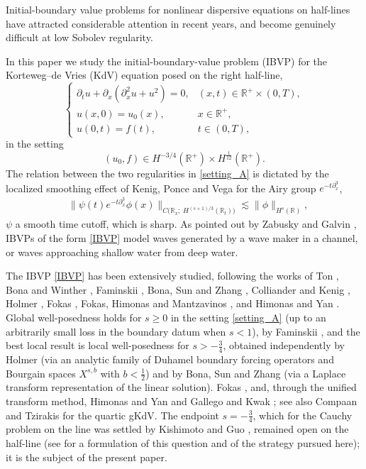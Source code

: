 \documentclass[10pt,reqno]{amsart}
\theoremstyle{remark}
\numberwithin{equation}{section}
\newcommand{\R}{\mathbb R}
\newcommand{\pd}{\partial}
\begin{document}
Initial-boundary value problems for nonlinear dispersive equations on half-lines have attracted considerable attention in recent years, and become genuinely difficult at low Sobolev regularity.

In this paper we study the initial-boundary-value problem (IBVP) for the Korteweg--de Vries (KdV) equation posed on the right half-line,
\begin{equation}\label{IBVP}
	\begin{cases}
		\partial_tu+\partial_x(\partial_x^2 u+u^2)=0  ,& (x,t)\in \mathbb R^+\times(0,T),\\
		u(x,0)=u_0(x),                                   & x\in \mathbb R^+,\\
		u(0,t)=f(t),                                     & t\in(0,T),
	\end{cases}
\end{equation}
in the setting
\begin{equation}\label{setting_A}
(u_0,f)\in H^{-3/4}(\R^+)\times H^{\frac{1}{12}}(\R^+).
\end{equation}
The relation between the two regularities in \eqref{setting_A} is dictated by the localized smoothing effect of Kenig, Ponce and Vega \cite{KPV} for the Airy group $e^{-t\pd_x^3}$,
\begin{align*}
&\|\psi(t) e^{-t\partial_x^3}\phi(x)\|_{C\big(\mathbb{R}_x;\; H^{(s+1)/3}(\mathbb{R}_t)\big)}\lesssim \|\phi\|_{H^s(\mathbb{R})},
\end{align*}
$\psi$ a smooth time cutoff, which is sharp. As pointed out by Zabusky and Galvin \cite{Zabusky}, IBVPs of the form \eqref{IBVP} model waves generated by a wave maker in a channel, or waves approaching shallow water from deep water.

The IBVP \eqref{IBVP} has been extensively studied, following the works of Ton \cite{Ton}, Bona and Winther \cite{BW,BW2}, Faminskii \cite{Fa,Fa2}, Bona, Sun and Zhang \cite{BSZ1,BSZ2}, Colliander and Kenig \cite{CK}, Holmer \cite{Holmer}, Fokas \cite{Fokas1}, Fokas, Himonas and Mantzavinos \cite{Fokas2}, and Himonas and Yan \cite{HY}. Global well-posedness holds for $s\ge0$ in the setting \eqref{setting_A} (up to an arbitrarily small loss in the boundary datum when $s<1$), by Faminskii \cite{Fa2}, and the best local result is local well-posedness for $s>-\frac34$, obtained independently by Holmer \cite{Holmer} (via an analytic family of Duhamel boundary forcing operators and Bourgain spaces $X^{s,b}$ with $b<\frac12$) and by Bona, Sun and Zhang \cite{BSZ1,BSZ2} (via a Laplace transform representation of the linear solution). Fokas \cite{Fokas1,Fokas2}, and, through the unified transform method, Himonas and Yan \cite{HY} and Gallego and Kwak \cite{GK}; see also Compaan and Tzirakis \cite{CT} for the quartic gKdV. The endpoint $s=-\frac34$, which for the Cauchy problem on the line was settled by Kishimoto \cite{Kishimoto} and Guo \cite{Guo}, remained open on the half-line (see \cite{Cav} for a formulation of this question and of the strategy pursued here); it is the subject of the present paper. 
\end{document}
